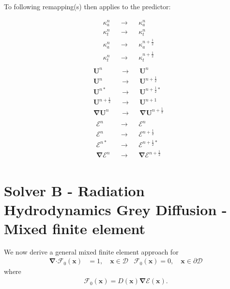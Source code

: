 \documentclass[10pt,letterpaper,notitlepage]{article}
\numberwithin{equation}{section}
\newcommand{\bnabla}{\boldsymbol{\nabla}}
\newcommand{\position}{\mathbf{x}}
\newcommand{\dotp}{\boldsymbol{\cdot}}
\newcommand{\RadE}{\mathcal{E}}
\newcommand{\RadF}{\boldsymbol{\mathcal{F}}}
\newcommand{\HydroU}{\mathbf{U}}
\newcommand{\RadJ}{\RadF_0}
\newcommand{\half}{\frac{1}{2}}
\newcommand{\beq}{\begin{equation*} \begin{aligned}}
\newcommand{\eeq}{\end{aligned}\end{equation*}}
\newcommand{\beqn}{\begin{equation}\begin{aligned}}
\newcommand{\eeqn}{\end{aligned}\end{equation}}
\begin{document}
To following remapping(s) then applies to the predictor:
\begin{multicols}{2}
\beq 
&\kappa_a^n &&\to &&\kappa_a^n \\
&\kappa_t^n &&\to &&\kappa_t^n \\
&\kappa_a^{n} &&\to &&\kappa_a^{n+\half} \\
&\kappa_t^{n} &&\to &&\kappa_t^{n+\half} \\
\eeq
\beq 
&\HydroU^{n}        &&\to &&\HydroU^{n}        \\
&\HydroU^{n}        &&\to &&\HydroU^{n+\half}  \\
&\HydroU^{n*}       &&\to &&\HydroU^{n+\half*} \\
&\HydroU^{n+\half}  &&\to &&\HydroU^{n+1}      \\
&\bnabla \HydroU^{n}        &&\to &&\bnabla \HydroU^{n+\half}  \\
\eeq
\columnbreak
\beq 
&\RadE^{n}        &&\to &&\RadE^{n}        \\
&\RadE^{n}        &&\to &&\RadE^{n+\half}  \\
&\RadE^{n*}       &&\to &&\RadE^{n+\half*} \\
&\bnabla \RadE^{n}        &&\to &&\bnabla \RadE^{n+\half}  \\
\eeq
\end{multicols}
 

\newpage 
\section{Solver B - Radiation Hydrodynamics Grey Diffusion - Mixed finite element}
We now derive a general mixed finite element approach for 
\begin{subequations} \label{eq:mfem_primary}
\beqn 
\bnabla \dotp \RadJ(\position) &= 1, \quad \position \in \mathcal{D} 
\eeqn 
\beqn 
\RadJ(\position) = 0, \quad \position \in \partial \mathcal{D}
\eeqn 
\end{subequations}
where 
\beqn \label{eq:mfem_f0}
\RadJ(\position) = D(\position) \bnabla \RadE(\position).
\eeqn 
\end{document}
